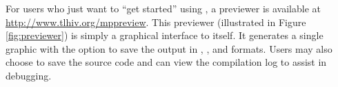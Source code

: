 For users who just want to ``get started'' using \MP{}, a \MP{}
previewer is available at \url{http://www.tlhiv.org/mppreview}.  This
previewer (illustrated in Figure \ref{fig:previewer}) is simply a
graphical interface to \MP{} itself.  It generates a single graphic with
the option to save the output in \EPS{}, \PDF{}, and \SVG{} formats.
Users may also choose to save the source code and can view the
compilation log to assist in debugging.
